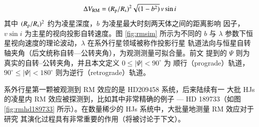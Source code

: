 \begin{equation} \label{eq:rvdvofrm}
\Delta V_\mathrm{RM} = (R_\mathrm{p} / R_\mathrm{s})^2 \sqrt{(1-b^2)} \, v\sin i
\end{equation} 
其中 $(R_\mathrm{p} / R_\mathrm{s})^2$ 约为凌星深度，$b$ 为凌星最大时刻两天体之间的距离影响
因子，$v\sin i$ 为主星的视向投影自转速度。图 \ref{fig:rmsim} 所示为不同的 $b$ 与 
$\lambda$ 参数下恒星视向速度的理论波动，$\lambda$ 在系外行星领域被称作投影行星
轨道法向与恒星自转轴夹角（后文统称自转---公转夹角），为观测测量可拟合量。前文
提到的 $\Psi$ 则为真实的自转--公转夹角，并且本文定义 $0 \leq |\Psi | < 90^\circ$ 为
顺行（prograde）轨道，$90^\circ \leq |\Psi | < 180^\circ $ 则为逆行（retrograde）轨道。


系外行星第一颗被观测到 RM 效应的是 HD209458 系统\cite{Queloz2000}，后来陆续有一
大批 HJs 的凌星内 RM 效应被探测到，比如其中非常精确的例子 --- HD 189733（如图 
\ref{fig:rmhd189733}  所示）。在数量稀少的 HJs 系统中，大批量地测量 RM 效应对于研究
其演化过程具有非常重要的作用（将被讨论于下文）。




